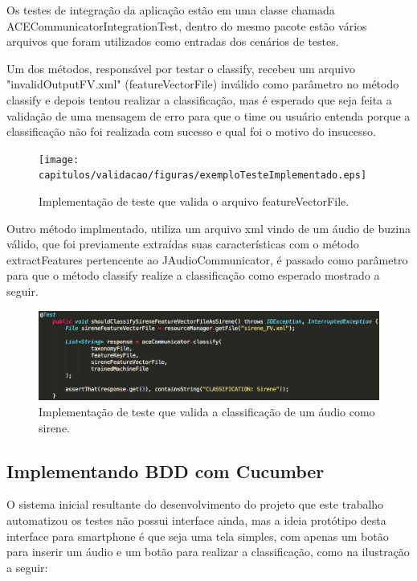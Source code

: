 \begin{itemize}
Os testes de integração da aplicação estão em uma classe chamada ACECommunicatorIntegrationTest, dentro do mesmo pacote estão vários arquivos que foram utilizados como entradas dos cenários de testes.

Um dos métodos, responsável por testar o classify, recebeu um arquivo "invalidOutputFV.xml" (featureVectorFile) inválido como parâmetro no método classify e depois tentou realizar a classificação, mas é esperado que seja feita a validação de uma mensagem de erro para que o time ou usuário entenda porque a classificação não foi realizada com sucesso e qual foi o motivo do insucesso.

\begin{figure}[H]
	\centering
	\captionsetup{justification=centering,margin=2cm}
	\texttt{[image: capitulos/validacao/figuras/exemploTesteImplementado.eps]}
	\caption{Implementação de teste que valida o arquivo featureVectorFile. }
	\label{fig:result-engajamento}
\end{figure}

 Outro método implmentado, utiliza um arquivo xml vindo de um áudio de buzina válido, que foi previamente extraídas suas características com o método extractFeatures pertencente ao JAudioCommunicator, é passado como parâmetro para que o método classify realize a classificação como esperado mostrado a seguir.
 
\begin{figure}[H]
	\centering
	\captionsetup{justification=centering,margin=2cm}
	\includegraphics[scale=0.55]{capitulos/validacao/figuras/outroTesteImplementado.eps}
	\caption{Implementação de teste que valida a classificação de um áudio como sirene.}
	\label{fig:result-engajamento}
\end{figure}

\end{itemize}

\subsection{Implementando BDD com Cucumber}

O sistema inicial resultante do desenvolvimento do projeto que este trabalho automatizou os testes não possui interface ainda, mas a ideia protótipo desta interface para smartphone é que seja uma tela simples, com apenas um botão para inserir um áudio e um botão para realizar a classificação, como na ilustração a seguir:


